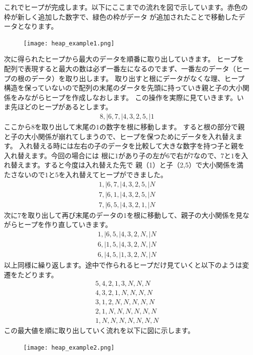 \documentclass[dvipdfmx,pic,eepic,ecltree]{jarticle}
\begin{document}
これでヒープが完成します。以下にここまでの流れを図で示しています。赤色の枠が新しく追加した数字で、緑色の枠がデータ
が追加されたことで移動したデータとなります。
 \begin{figure}[H]
 \begin{center}
\texttt{[image: heap\_example1.png]}
\end{center}
\end{figure}
次に得られたヒープから最大のデータを順番に取り出していきます。
ヒープを配列で表現すると最大の数は必ず一番左になるのでまず、一番左のデータ（ヒープの根のデータ）を取り出します。
取り出すと根にデータがなくな理、ヒープ構造を保っていないので配列の末尾のダータを先頭に持っていき親と子の大小関係をみながらヒープを作成しなおします。
この操作を実際に見ていきます。いま先ほどのヒープがあるとします。
\begin{eqnarray}
8, |6, 7,| 4, 3, 2, 5,| 1
\end{eqnarray}
ここから$8$を取り出して末尾の$1$の数字を根に移動します。
すると根の部分で親と子の大小関係が崩れてしまうので、ヒープを保つためにデータを入れ替えます。
入れ替える時には左右の子のデータを比較して大きな数字を持つ子と親を入れ替えます。今回の場合には
根に$1$があり子の左が$6$で右が$7$なので、$7$と$1$を入れ替えます。すると今度は入れ替えた先で
親（1）と子（2,5）で大小関係を満たさないので$1$と$5$を入れ替えてヒープができました。
\begin{eqnarray}
1,| 6, 7,| 4, 3, 2, 5,| N\\
7,| 6, 1,| 4, 3, 2, 5,| N \\
7,| 6, 5,| 4, 3, 2, 1,| N 
\end{eqnarray}
次に$7$を取り出して再び末尾のデータの$1$を根に移動して、親子の大小関係を見ながらヒープを作り直していきます。
\begin{eqnarray}
1,| 6, 5,| 4, 3, 2, N,| N\\
6,| 1, 5,| 4, 3, 2, N,| N\\
6,| 4, 5,| 1, 3, 2, N,| N
\end{eqnarray}
以上同様に繰り返します。途中で作られるヒープだけ見ていくと以下のようは変遷をたどります。
\begin{eqnarray}
5, 4, 2, 1, 3, N, N, N\\
4, 3, 2, 1, N, N, N, N\\
3, 1, 2, N, N, N, N, N\\
2, 1, N, N, N, N, N, N\\
1, N, N, N, N, N, N, N
\end{eqnarray}
この最大値を順に取り出していく流れを以下に図に示します。
 \begin{figure}[H]
 \begin{center}
\texttt{[image: heap\_example2.png]}
\end{center}
\end{figure}
\end{document}
